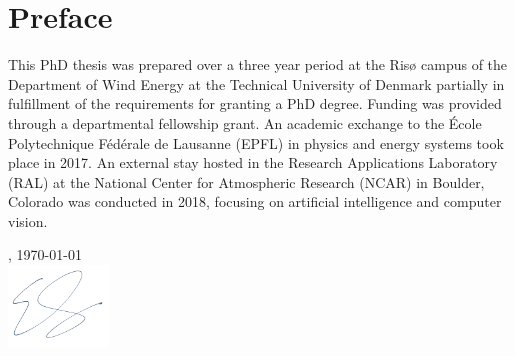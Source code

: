 \chapter{Preface}
\label{sec:preface}


This PhD thesis was prepared over a three year period at the Ris{\o} campus of the Department of Wind Energy at the Technical University of Denmark partially in fulfillment of the requirements for granting a PhD degree. Funding was provided through a departmental fellowship grant. An academic exchange to the {\'E}cole Polytechnique F{\'e}d{\'e}rale de Lausanne (EPFL) in physics and energy systems took place in 2017. An external stay hosted in the Research Applications Laboratory (RAL) at the National Center for Atmospheric Research (NCAR) in Boulder, Colorado was conducted in 2018, focusing on artificial intelligence and computer vision.

\vfill

{
\flushright
    \thesislocation{}, \today\\[1cm]
    \hspace{3cm}\includegraphics[width=0.2\textwidth]{graphics/signature.png}\\[1cm]
\begin{flushright}
    \thesisauthor{}
\end{flushright}
}
